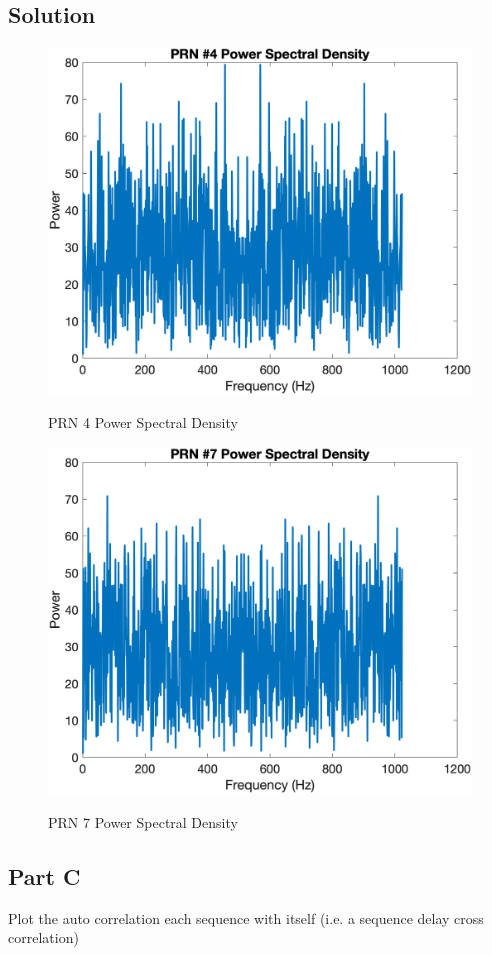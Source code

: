 \documentclass{article}
\begin{document}
\subsection*{Solution}
\begin{figure}[H]
    \centering
    \includegraphics[width=0.75\linewidth]{../figures/p8_prn4_psd.png}\label{p8_prn4_psd}
    \caption{PRN 4 Power Spectral Density}
\end{figure}
\begin{figure}[H]
    \centering
    \includegraphics[width=0.75\linewidth]{../figures/p8_prn7_psd.png}\label{p8_prn7_psd}
    \caption{PRN 7 Power Spectral Density}
\end{figure}

\subsection*{Part C}
Plot the auto correlation each sequence with itself (i.e. a sequence delay cross
correlation)
\end{document}
